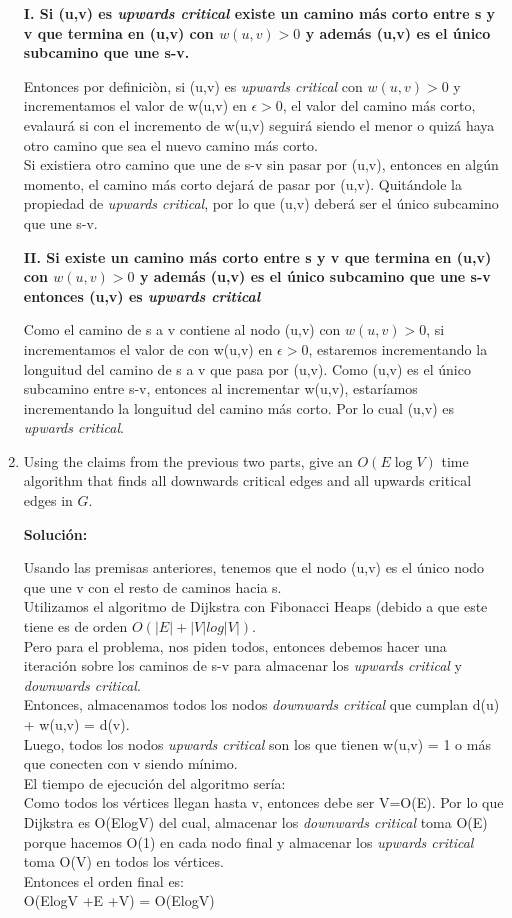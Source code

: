 \documentclass{article}
\begin{document}
\begin{enumerate}
  \textbf{I. Si (u,v) es \textit{upwards critical} existe un camino más corto entre s y v que termina en (u,v) con $w(u,v) > 0$ y además (u,v) es el único subcamino que une s-v.}
  
  Entonces por definiciòn, si (u,v) es \textit{upwards critical} con $w(u,v)>0$ y incrementamos el valor de w(u,v) en $\epsilon>0$, el valor del camino más corto, evalaurá si con el incremento de w(u,v) seguirá siendo el menor o quizá haya otro camino que sea el nuevo camino más corto.\\
  Si existiera otro camino que une de s-v sin pasar por (u,v), entonces en algún momento, el camino más corto dejará de pasar por (u,v). Quitándole la propiedad de \textit{upwards critical}, por lo que (u,v) deberá ser el único subcamino que une s-v.
  
  \textbf{II. Si existe un camino más corto entre s y v que termina en (u,v) con $w(u,v) > 0$ y además (u,v) es el único subcamino que une s-v entonces (u,v) es \textit{upwards critical}}
  
  Como el camino de s a v contiene al nodo (u,v) con $w(u,v)>0$, si incrementamos el valor de con w(u,v) en $\epsilon>0$, estaremos incrementando la longuitud del camino de s a v que pasa por (u,v). Como (u,v) es el único subcamino entre s-v, entonces al incrementar w(u,v), estaríamos incrementando la longuitud del camino más corto. Por lo cual (u,v) es \textit{upwards critical}.
  
  \item  Using the claims from the previous two parts,
    give an $O(E \log V)$ time algorithm that finds all downwards
    critical edges and all upwards critical edges in $G$.
  
  \textbf{Solución:}
  
  Usando las premisas anteriores, tenemos que el nodo (u,v) es el único nodo que une v con el resto de caminos hacia s.\\
  Utilizamos el algoritmo de Dijkstra con Fibonacci Heaps (debido a que este tiene es de orden $O(|E|+|V|log|V|).$\\
  Pero para el problema, nos piden todos, entonces debemos hacer una iteración sobre los caminos de s-v para almacenar los \textit{upwards critical} y \textit{downwards critical}.\\
  Entonces, almacenamos todos los nodos \textit{downwards critical} que cumplan d(u) + w(u,v) = d(v).\\
  Luego, todos los nodos \textit{upwards critical} son los que tienen w(u,v) = 1 o más que conecten con v siendo mínimo.\\
  El tiempo de ejecución del algoritmo sería:\\
  Como todos los vértices llegan hasta v, entonces debe ser V=O(E). Por lo que Dijkstra es O(ElogV) del cual, almacenar los \textit{downwards critical} toma O(E) porque hacemos O(1) en cada nodo final y almacenar los \textit{upwards critical} toma O(V) en todos los vértices.\\
  Entonces el orden final es:\\
  O(ElogV +E +V) = O(ElogV)
  
  \end{enumerate}
  
\end{document}
